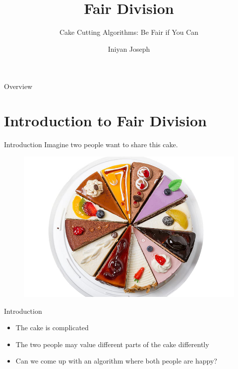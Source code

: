 \documentclass[aspectratio=169,xcolor=dvipsnames]{beamer}
\title[short title]{Fair Division} %
\subtitle{Cake Cutting Algorithms: Be Fair if You Can}
\author[Iniyan Joseph] {Iniyan Joseph}
\institute[UTD] %
{
    University of Texas at Dallas %
}
\date{} %
\begin{document}

\begin{frame}
    \titlepage
\end{frame}

\begin{frame}{Overview}
    \tableofcontents
\end{frame}

\section{Introduction to Fair Division}

\begin{frame}{Introduction}
	Imagine two people want to share this cake.
	\begin{figure}
		\includegraphics[width=0.75\linewidth]{cakeImage}
	\end{figure}
\end{frame}

\begin{frame}{Introduction}
    \begin{itemize}
        \item The cake is complicated
        \item The two people may value different parts of the cake differently\pause
        \item Can we come up with an algorithm where both people are happy?
    \end{itemize}
\end{frame}
\end{document}
